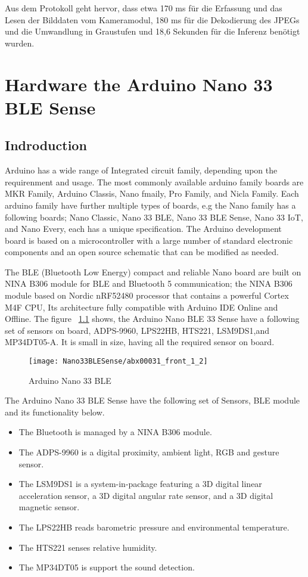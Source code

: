 Aus dem Protokoll geht hervor, dass etwa 170 ms für die Erfassung und das Lesen der Bilddaten vom Kameramodul, 180 ms für die Dekodierung des JPEGs und die Umwandlung in Graustufen und 18,6 Sekunden für die Inferenz benötigt wurden.


\chapter{Hardware the Arduino Nano 33 BLE Sense}

\section{Indroduction}

Arduino has a wide range of Integrated circuit family, depending upon the requirenment and usage. The most commonly available arduino family boards are MKR Family, Arduino Classis, Nano fmaily, Pro Family, and Nicla Family. Each arduino family have further multiple types of boards, e.g the Nano family has a following boards; Nano Classic, Nano 33 BLE, Nano 33 BLE Sense, Nano 33 IoT, and Nano Every, each has a unique specification. The Arduino development board is based on a microcontroller with a large number of standard electronic components and an open source schematic that can be modified as needed.

The BLE (Bluetooth Low Energy) compact and reliable Nano board are built on NINA B306 module for BLE and Bluetooth 5 communication; the NINA B306 module based on Nordic nRF52480 processor that contains a powerful Cortex M4F CPU, Its architecture fully compatible with Arduino IDE Online and Offline. The figure ~\ref{fig:abx00031front12} shows, the Arduino Nano BLE 33 Sense have a following set of sensors on board, ADPS-9960, LPS22HB, HTS221, LSM9DS1,and MP34DT05-A. It is small in size, having all the required sensor on board. \cite{ArduinoNano33:2021}



\begin{figure}[ht]
	\centering
	\texttt{[image: Nano33BLESense/abx00031\_front\_1\_2]}
	\caption{Arduino Nano 33 BLE}
	\label{fig:abx00031front12}
\end{figure}

The Arduino Nano 33 BLE Sense have the following set of Sensors, BLE module and its functionality below.

\begin{itemize}
	\item The Bluetooth is managed by a NINA B306 module.
	\item The ADPS-9960 is a digital proximity, ambient light, RGB and gesture sensor.
	\item The LSM9DS1 is a system-in-package featuring a 3D digital linear acceleration sensor, a 3D digital angular rate sensor, and a 3D digital magnetic sensor.
	\item The LPS22HB reads barometric pressure and environmental temperature.
	\item The HTS221 senses relative humidity.
	\item The MP34DT05 is support the sound detection.
\end{itemize}

